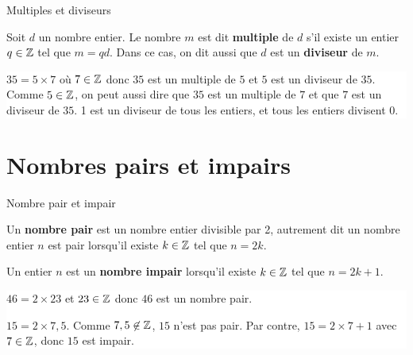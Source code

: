 \begin{DefTB}{Multiples et diviseurs} 

\hspace{1mm}
\begin{minipage}{0.98\linewidth}

Soit $d$ un nombre entier. Le nombre $m$ est dit \textbf{multiple} de $d$ s'il existe un entier $q \in \mathbb Z$ tel que $m=qd$. Dans ce cas, on dit aussi que $d$ est un \textbf{diviseur} de $m$.

\end{minipage}

\vspace{3mm}
\colorbox{white}{
\begin{minipage}{0.98\linewidth}
 
  $35=5 \times 7$ où $7 \in \mathbb Z$ donc $35$ est un multiple de $5$
  et $5$ est un diviseur de $35$. Comme $5 \in \mathbb Z$, on peut aussi
  dire que $35$ est un multiple de $7$ et que $7$ est un diviseur de
  $35$.
  1 est un diviseur de tous les entiers, et tous les entiers
  divisent 0.
 
\end{minipage}
}
\end{DefTB}



\section{ Nombres pairs et impairs }
 
\begin{DefTB}{Nombre  pair  et impair } 

\hspace{1mm}
\begin{minipage}{0.98\linewidth}

 Un \textbf{nombre pair} est un nombre entier divisible par 2, autrement
  dit un nombre entier $n$ est pair lorsqu'il existe $k \in \mathbb Z$
  tel que $n=2k$.

  Un entier $n$ est un \textbf{nombre impair} lorsqu'il existe $k \in \mathbb Z$
  tel que $n=2k+1$.

\end{minipage}

 
 \vspace{3mm}
\colorbox{white}{
\begin{minipage}{0.98\linewidth}

$46 = 2 \times 23$ et $23\in\mathbb Z$ donc $46$ est un nombre pair.

  $15= 2 \times 7,5$. Comme $7,5 \not\in\mathbb Z$, $15$ n'est pas pair. Par contre,
  $15=2 \times 7+1$ avec $7 \in \mathbb Z$, donc $15$ est impair.  
 \end{minipage}
}

\end{DefTB}


